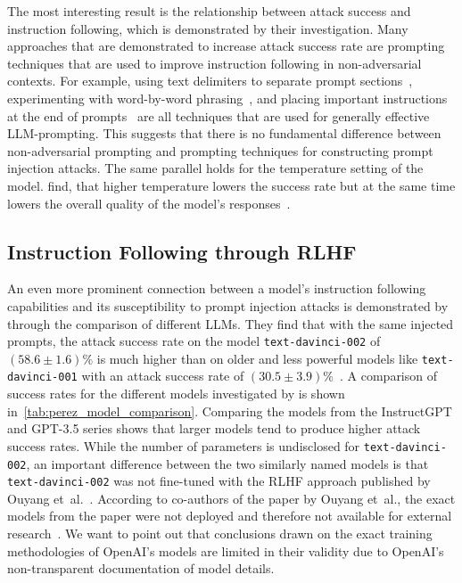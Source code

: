 The most interesting result is the relationship between attack success and instruction following, which is demonstrated by their investigation.
Many approaches that are demonstrated to increase attack success rate are prompting techniques that are used to improve instruction following in non-adversarial contexts.
For example, using text delimiters to separate prompt sections~\cite{schulhoff_prompt_2025}, experimenting with word-by-word phrasing~\cite{kamath_prompt-based_2024}, and placing important instructions at the end of prompts~\cite{schulhoff_prompt_2025} are all techniques that are used for generally effective LLM-prompting.
This suggests that there is no fundamental difference between non-adversarial prompting and prompting techniques for constructing prompt injection attacks.
The same parallel holds for the temperature setting of the model.
\perez find, that higher temperature lowers the success rate but at the same time lowers the overall quality of the model's responses~\cite{perez_ignore_2022}.\\

\subsection{Instruction Following through RLHF} \label{sec:RLHF_instr_following}
An even more prominent connection between a model's instruction following capabilities and its susceptibility to prompt injection attacks is demonstrated by \perez through the comparison of different LLMs.
They find that with the same injected prompts, the attack success rate on the model \texttt{text-davinci-002} of $(58.6 \pm 1.6)\%$ is much higher than on older and less powerful models like \texttt{text-davinci-001} with an attack success rate of $(30.5 \pm 3.9)\%$~\cite{perez_ignore_2022}.
A comparison of success rates for the different models investigated by \perez is shown in~\cref{tab:perez_model_comparison}.
Comparing the models from the InstructGPT and GPT-3.5 series shows that larger models tend to produce higher attack success rates. 
While the number of parameters is undisclosed for \texttt{text-davinci-002}, an important difference between the two similarly named models is that \texttt{text-davinci-002} was not fine-tuned with the RLHF approach published by Ouyang et~al.~\cite{janus_update_2022, mcdonnell_openai_2022}.
According to co-authors of the paper by Ouyang et~al., the exact models from the paper were not deployed and therefore not available for external research~\cite{jan_leike_janleike_sarahwiegreffe_2022}.
We want to point out that conclusions drawn on the exact training methodologies of OpenAI's models are limited in their validity due to OpenAI's non-transparent documentation of model details.\\

